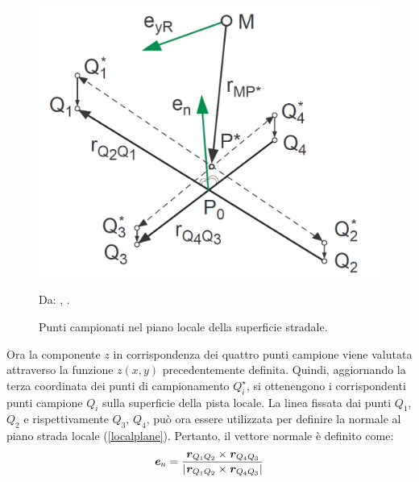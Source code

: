 \begin{figure}[h]
	\centering
	\includegraphics[width=0.5\linewidth]{Figures/local_track}
	\caption{Punti campionati nel piano locale della superficie stradale.}
	Da: \citeauthor{Rill}, .
	\label{localtrack}
\end{figure}
%
\noindent
Ora la componente $z$ in corrispondenza dei quattro punti campione viene valutata attraverso la funzione $z(x,y)$ precedentemente definita. Quindi, aggiornando la terza coordinata dei punti di campionamento $Q^\star_i$, si ottenengono i corrispondenti punti campione $Q_i$ sulla superficie della pista locale. La linea fissata dai punti $Q_1$, $Q_2$ e rispettivamente $Q_3$, $Q_4$, può ora essere utilizzata per definire la normale al piano strada locale (\figurename \ref{localplane}). Pertanto, il vettore normale è definito come:
%
\begin{equation}
\textbf{\textit{e}}_n = \frac{\textbf{\textit{r}}_{Q_1 Q_2} \times \textbf{\textit{r}}_{Q_4 Q_3}}{|\textbf{\textit{r}}_{Q_1 Q_2} \times \textbf{\textit{r}}_{Q_4 Q_3}|}
\end{equation}

